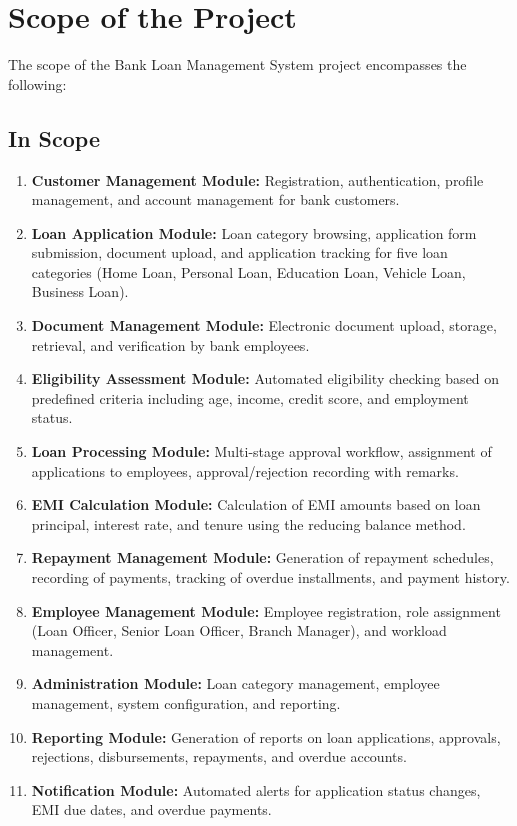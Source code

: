 \section{Scope of the Project}

The scope of the Bank Loan Management System project encompasses the following:

\subsection{In Scope}

\begin{enumerate}
  \item \textbf{Customer Management Module:} Registration, authentication, profile management, and account management for bank customers.
  \item \textbf{Loan Application Module:} Loan category browsing, application form submission, document upload, and application tracking for five loan categories (Home Loan, Personal Loan, Education Loan, Vehicle Loan, Business Loan).
  \item \textbf{Document Management Module:} Electronic document upload, storage, retrieval, and verification by bank employees.
  \item \textbf{Eligibility Assessment Module:} Automated eligibility checking based on predefined criteria including age, income, credit score, and employment status.
  \item \textbf{Loan Processing Module:} Multi-stage approval workflow, assignment of applications to employees, approval/rejection recording with remarks.
  \item \textbf{EMI Calculation Module:} Calculation of EMI amounts based on loan principal, interest rate, and tenure using the reducing balance method.
  \item \textbf{Repayment Management Module:} Generation of repayment schedules, recording of payments, tracking of overdue installments, and payment history.
  \item \textbf{Employee Management Module:} Employee registration, role assignment (Loan Officer, Senior Loan Officer, Branch Manager), and workload management.
  \item \textbf{Administration Module:} Loan category management, employee management, system configuration, and reporting.
  \item \textbf{Reporting Module:} Generation of reports on loan applications, approvals, rejections, disbursements, repayments, and overdue accounts.
  \item \textbf{Notification Module:} Automated alerts for application status changes, EMI due dates, and overdue payments.
\end{enumerate}

